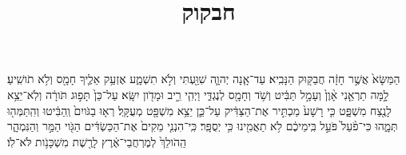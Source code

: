 \documentclass{openreader}
\title{חבקוק}
\date{}
\begin{document}
\maketitle
\raggedbottom 
\fontsize{16pt}{24pt}\selectfont


הַמַּשָּׂא֙ אֲשֶׁ֣ר חָזָ֔ה חֲבַקּ֖וּק הַנָּבִֽיא׃ 
עַד־אָ֧נָה יְהוָ֛ה שִׁוַּ֖עְתִּי וְלֹ֣א תִשְׁמָ֑ע אֶזְעַ֥ק אֵלֶ֛יךָ חָמָ֖ס וְלֹ֥א תֹושִֽׁיעַ׃ 
לָ֣מָּה תַרְאֵ֤נִי אָ֨וֶן֙ וְעָמָ֣ל תַּבִּ֔יט וְשֹׁ֥ד וְחָמָ֖ס לְנֶגְדִּ֑י וַיְהִ֧י רִ֦יב וּמָדֹ֖ון יִשָּֽׂא׃ 
עַל־כֵּן֙ תָּפ֣וּג תֹּורָ֔ה וְלֹֽא־יֵצֵ֥א לָנֶ֖צַח מִשְׁפָּ֑ט כִּ֤י רָשָׁע֙ מַכְתִּ֣יר אֶת־הַצַּדִּ֔יק עַל־כֵּ֛ן יֵצֵ֥א מִשְׁפָּ֖ט מְעֻקָּֽל׃ 
רְא֤וּ בַגֹּויִם֙ וְֽהַבִּ֔יטוּ וְהִֽתַּמְּה֖וּ תְּמָ֑הוּ כִּי־פֹ֨עַל֙ פֹּעֵ֣ל בִּֽימֵיכֶ֔ם לֹ֥א תַאֲמִ֖ינוּ כִּ֥י יְסֻפָּֽר׃ 
כִּֽי־הִנְנִ֤י מֵקִים֙ אֶת־הַכַּשְׂדִּ֔ים הַגֹּ֖וי הַמַּ֣ר וְהַנִּמְהָ֑ר הַֽהֹולֵךְ֙ לְמֶרְחֲבֵי־אֶ֔רֶץ לָרֶ֖שֶׁת מִשְׁכָּנֹ֥ות לֹּא־לֹֽו׃ 
\end{document}
